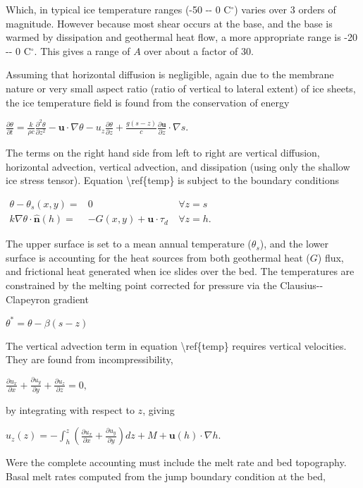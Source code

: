 Which, in typical ice temperature ranges (-50 -{}- 0 C$^\circ$) varies
over 3 orders of magnitude. However because most shear occurs at the
base, and the base is warmed by dissipation and geothermal heat flow, a
more appropriate range is -20 -{}- 0 C$^\circ$. This gives a range of
$A$ over about a factor of 30.

Assuming that horizontal diffusion is negligible, again due to the
membrane nature or very small aspect ratio (ratio of vertical to lateral
extent) of ice sheets, the ice temperature field is found from the
conservation of energy

$ 
\frac{\partial \theta}{\partial t} = \frac{k}{\rho c}
\frac{\partial^2
\theta}{\partial z^2} -
\mathbf{u} \cdot \nabla \theta -
u_z \frac{\partial \theta}{\partial z} 
+ \frac{g(s-z)}{c}\frac{\partial \mathbf{u}}{\partial z} \cdot \nabla s.
$

The terms on the right hand side from left to right are vertical
diffusion, horizontal advection, vertical advection, and dissipation
(using only the shallow ice stress tensor). Equation
\textbackslash{}ref\{temp\} is subject to the boundary conditions

$\begin{matrix}
\theta - \theta_s(x,y) = & 0 &~\forall z=s \\
k \nabla \theta \cdot \mathbf{\hat n}(h) =& -G(x,y) + \mathbf{u} \cdot \tau_d
&~\forall z=h.
\end{matrix}$

The upper surface is set to a mean annual temperature ($\theta_s$), and
the lower surface is accounting for the heat sources from both
geothermal heat ($G$) flux, and frictional heat generated when ice
slides over the bed. The temperatures are constrained by the melting
point corrected for pressure via the Clausius-{}-Clapeyron gradient

$
\theta^* = \theta - \beta (s-z)
$

The vertical advection term in equation \textbackslash{}ref\{temp\}
requires vertical velocities. They are found from incompressibility,

$
\frac{\partial u_x}{\partial x} + 
\frac{\partial u_y}{\partial y} +
\frac{\partial u_z}{\partial z} = 0,
$

by integrating with respect to $z$, giving

$
u_z(z) = -\int_h^z \left( \frac{\partial u_x}{\partial x} + \frac{\partial
u_y}{\partial y}\right ) dz + M + \mathbf{u}(h) \cdot \nabla h.
$

Were the complete accounting must include the melt rate and bed
topography. Basal melt rates computed from the jump boundary condition
at the bed,


